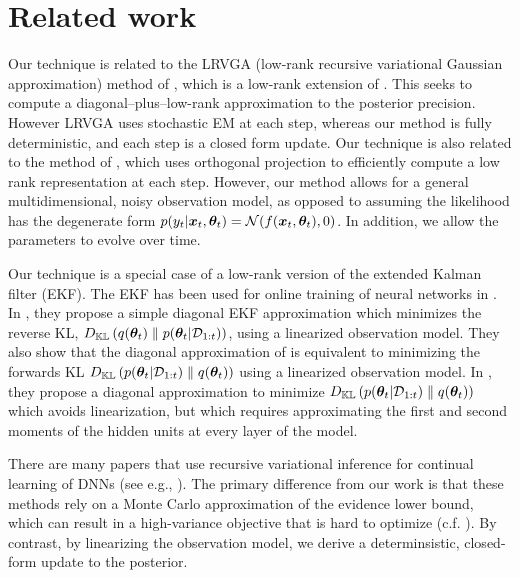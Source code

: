 \section{Related work}
\label{sec:related}





Our technique is related to
the LRVGA (low-rank recursive variational Gaussian approximation) method of \citep{LRVGA},
which is a low-rank extension of \citep{RVGA}.
This seeks to compute a diagonal--plus--low-rank approximation to the posterior precision. 
However LRVGA uses stochastic EM at each step,
whereas our method is fully deterministic,
and each step is a closed form update.
Our technique is also related to 
the \orfit method of \citep{ORFit},
which uses orthogonal projection to efficiently
compute a low rank representation at each step.
However, our method allows
for a general multidimensional, noisy observation model, as opposed to assuming the likelihood has the degenerate form $p(y_t|{\bm{x}}_t,{\bm{\theta}}_t) =\mathcal{N}(f({\bm{x}}_t,{\bm{\theta}}_t), 0)$.
In  addition, we allow the parameters to evolve over time.

Our technique is a special case of a low-rank version
of the extended Kalman filter (EKF).
The EKF has been used for online training of neural networks
 in \citep{Singhal1988,Watanabe1990,Puskorius1991,Haykin01}.
In \citep{Chang2022},
they propose a simple diagonal EKF approximation
which minimizes the reverse KL,
$D_{\mathbb{KL}}\left({q({\bm{\theta}}_t)} \mathrel{\|} {p({\bm{\theta}}_t|{\mathcal{D}}_{1:t})}\right)$,
using a linearized observation model.
They also show that  the diagonal approximation of 
 \citep{Puskorius1991} is equivalent to minimizing
 the forwards KL
$D_{\mathbb{KL}}\left({p({\bm{\theta}}_t|{\mathcal{D}}_{1:t})} \mathrel{\|} {q({\bm{\theta}}_t)}\right)$
using  a linearized observation model.
In \citep{Ghosh2016,Wagner2022},
they propose  a diagonal approximation
to minimize $D_{\mathbb{KL}}\left({p({\bm{\theta}}_t|{\mathcal{D}}_{1:t})} \mathrel{\|} {q({\bm{\theta}}_t)}\right)$
which avoids linearization, but which requires
approximating the first and second moments of the hidden
units at every layer of the model.

There are many papers that use recursive variational inference for continual learning of DNNs  (see e.g., 
\citep{Nguyen2018continual,Broderick2013,Kurle2020,Zeno2021}).
The primary difference from our work is that these methods rely on a Monte Carlo approximation of the evidence lower bound, which can result in a high-variance objective that is hard to optimize (c.f. \citep{Wu2019VB}).
By contrast, by linearizing the observation model, 
we derive a determinsistic, closed-form update to the posterior.

